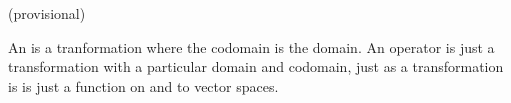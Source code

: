
\sbasic



















\sstart
{}


(provisional)

An  is a tranformation where the codomain is the domain.
An operator is just a transformation with a particular domain and codomain, just as a transformation is is just a function on and to vector spaces.
\strats
